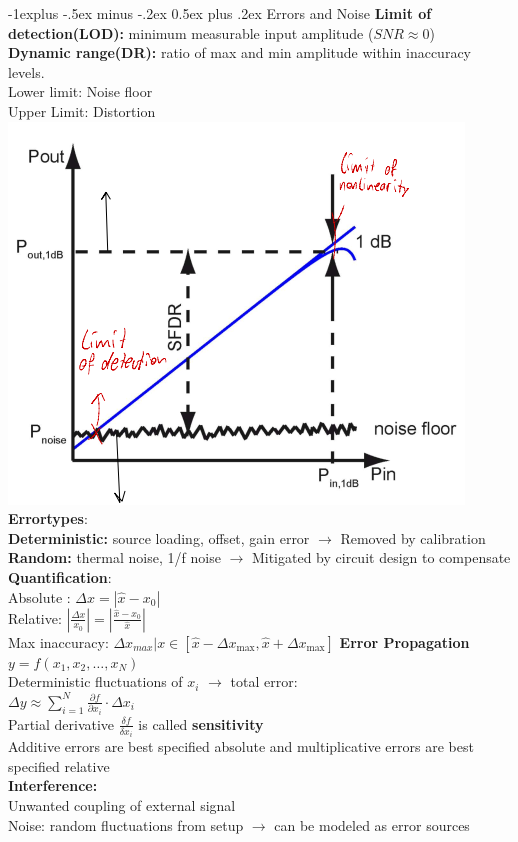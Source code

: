 \documentclass[5pt]{article}
\makeatletter
\renewcommand{\subsection}{\@startsection{subsection}{2}{0mm}%
                                {-1explus -.5ex minus -.2ex}%
                                {0.5ex plus .2ex}%
                                {\normalfont\normalsize\bfseries}}
\makeatother
\begin{document}
\begin{multicols*}{4}
 \subsection{Errors and Noise}
 \textbf{Limit of detection(LOD):} minimum measurable input amplitude ($ SNR \approx 0 $)  \\
 \textbf{Dynamic range(DR):} ratio of max and min amplitude within inaccuracy levels.\\
 Lower limit: Noise floor\\
 Upper Limit: Distortion
 \includegraphics[width = 0.8\columnwidth]{images/lod_dr.png}\\
 \textbf{Errortypes}:\\
\textbf{ Deterministic:} source loading, offset, gain error $ \rightarrow $
Removed by calibration\\
\textbf{ Random:} thermal noise, 1/f noise $ \rightarrow $
Mitigated by circuit design to compensate\\
 \textbf{Quantification}:\\
 Absolute : $ \Delta x=\left|\hat{x}-x_{0}\right| $\\
Relative: $\left|\frac{\Delta x}{x_{0}}\right|=\left|\frac{\hat{x}-x_{0}}{\hat{x}}\right|  $\\
Max inaccuracy: $ \Delta x_{max}| x \in \left[\hat{x}-\Delta x_{\max }, \hat{x}+\Delta x_{\max }\right] $
\textbf{Error Propagation}\\
$ y=f\left(x_{1}, x_{2}, \ldots, x_{N}\right) $\\
Deterministic fluctuations of $ x_i $ $ \rightarrow $ total error:\\
$\Delta y \approx \sum_{i=1}^{N} \frac{\partial f}{\partial x_{i}} \cdot \Delta x_{i}  $\\
Partial derivative $ \frac{\delta f}{\delta x_i} $ is called \textbf{sensitivity}\\
Additive errors are best specified absolute and multiplicative errors are best specified relative \\
\textbf{Interference:}\\
Unwanted coupling of external signal\\
Noise: random fluctuations from setup $ \rightarrow $ can be modeled as error sources

\end{multicols*}
\end{document}
